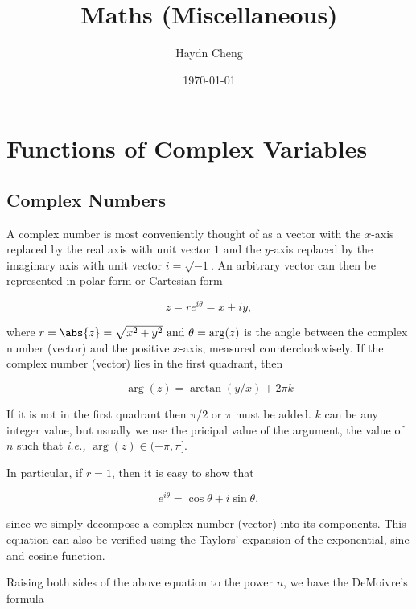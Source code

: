 \documentclass[english,a4paper,12pt]{report}
\title{Maths (Miscellaneous)}
\author{Haydn Cheng}
\date{\today}
\begin{document}
\maketitle
\tableofcontents

\chapter{Functions of Complex Variables}

\section{Complex Numbers}

A complex number is most conveniently thought of as a vector with the \(x\)-axis replaced by the real axis with unit vector \(1\) and the \(y\)-axis replaced by the imaginary axis with unit vector \(i = \sqrt{-1} \). An arbitrary vector can then be represented in polar form or Cartesian form

\begin{equation}
	z = re^{i \theta } = x + iy, 
\end{equation}

where \( r = \abs{z} = \sqrt{x^2 + y^2} \text { and } \theta = \arg (z)\) is the angle between the complex number (vector) and the positive \(x\)-axis, measured counterclockwisely. If the complex number (vector) lies in the first quadrant, then 

\begin{equation}
    \arg (z) = \arctan {\left(y /x \right)} + 2\pi k
\end{equation}

If it is not in the first quadrant then \(\pi /2 \text { or } \pi \) must be added. \(k\) can be any integer value, but usually we use the pricipal value of the argument, the value of \(n\) such that \textit{i.e.,} \(\arg (z) \in (-\pi ,\pi ]\).
 
In particular, if \(r=1\), then it is easy to show that 

\begin{equation}
	e^{i \theta } = \cos \theta + i\sin \theta ,
\end{equation}

since we simply decompose a complex number (vector) into its components. This equation can also be verified using the Taylors' expansion of the exponential, sine and cosine function.

Raising both sides of the above equation to the power \(n\), we have the DeMoivre's formula
\end{document}

